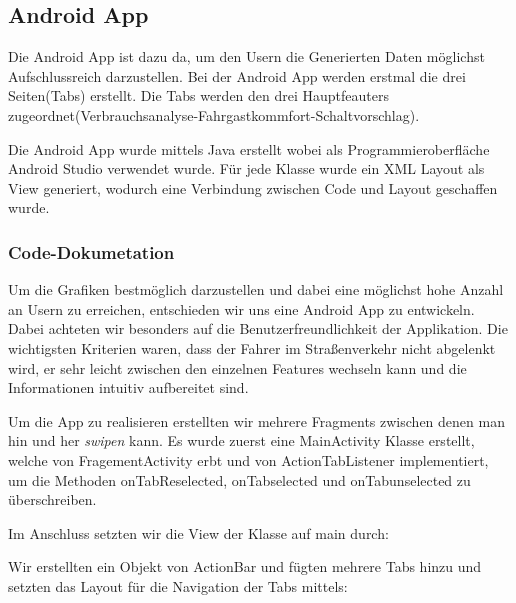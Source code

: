 \subsection{Android App}
Die Android App ist dazu da, um den Usern die Generierten Daten möglichst Aufschlussreich darzustellen.
Bei der Android App werden erstmal die drei Seiten(Tabs) erstellt. Die Tabs werden den drei Hauptfeauters zugeordnet(Verbrauchsanalyse-Fahrgastkommfort-Schaltvorschlag). 

\label{subsec:androidapp}

Die Android App wurde mittels Java erstellt wobei als Programmieroberfläche Android Studio verwendet wurde.
Für jede Klasse wurde ein XML Layout als View generiert, wodurch eine Verbindung zwischen Code und Layout geschaffen wurde.

\subsubsection{Code-Dokumetation}
 Um die Grafiken bestmöglich darzustellen und dabei eine möglichst hohe Anzahl an Usern zu erreichen, entschieden wir uns eine Android App zu entwickeln.
 Dabei achteten wir besonders auf die Benutzerfreundlichkeit der Applikation.
 Die wichtigsten Kriterien waren, dass der Fahrer im Straßenverkehr nicht abgelenkt wird, er sehr leicht zwischen den einzelnen Features wechseln kann und die Informationen intuitiv aufbereitet sind.
 
 Um die App zu realisieren erstellten wir mehrere Fragments zwischen denen man hin und her \textit{swipen} kann.
  Es wurde zuerst eine MainActivity Klasse erstellt, welche von FragementActivity erbt und von ActionTabListener implementiert, um die Methoden onTabReselected, onTabselected und onTabunselected zu überschreiben. 



  
 
            
Im Anschluss setzten wir die View der Klasse auf main durch:  



Wir erstellten ein Objekt von ActionBar und fügten mehrere Tabs hinzu und setzten das Layout für die Navigation der Tabs mittels:



